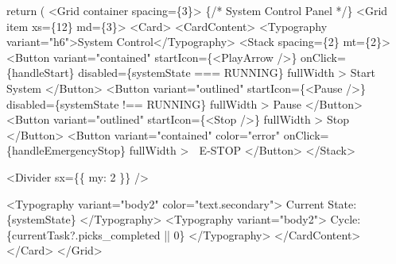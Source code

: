 \documentclass[
]{article}
\newenvironment{Shaded}{\begin{snugshade}}{\end{snugshade}}
\newcommand{\NormalTok}[1]{#1}
\begin{document}
\begin{Shaded}
\begin{Highlighting}[]
\NormalTok{  return (}
\NormalTok{    \textless{}Grid container spacing=\{3\}\textgreater{}}
\NormalTok{      \{/* System Control Panel */\}}
\NormalTok{      \textless{}Grid item xs=\{12\} md=\{3\}\textgreater{}}
\NormalTok{        \textless{}Card\textgreater{}}
\NormalTok{          \textless{}CardContent\textgreater{}}
\NormalTok{            \textless{}Typography variant="h6"\textgreater{}System Control\textless{}/Typography\textgreater{}}
\NormalTok{            \textless{}Stack spacing=\{2\} mt=\{2\}\textgreater{}}
\NormalTok{              \textless{}Button}
\NormalTok{                variant="contained"}
\NormalTok{                startIcon=\{\textless{}PlayArrow /\textgreater{}\}}
\NormalTok{                onClick=\{handleStart\}}
\NormalTok{                disabled=\{systemState === \textquotesingle{}RUNNING\textquotesingle{}\}}
\NormalTok{                fullWidth}
\NormalTok{              \textgreater{}}
\NormalTok{                Start System}
\NormalTok{              \textless{}/Button\textgreater{}}
\NormalTok{              \textless{}Button}
\NormalTok{                variant="outlined"}
\NormalTok{                startIcon=\{\textless{}Pause /\textgreater{}\}}
\NormalTok{                disabled=\{systemState !== \textquotesingle{}RUNNING\textquotesingle{}\}}
\NormalTok{                fullWidth}
\NormalTok{              \textgreater{}}
\NormalTok{                Pause}
\NormalTok{              \textless{}/Button\textgreater{}}
\NormalTok{              \textless{}Button}
\NormalTok{                variant="outlined"}
\NormalTok{                startIcon=\{\textless{}Stop /\textgreater{}\}}
\NormalTok{                fullWidth}
\NormalTok{              \textgreater{}}
\NormalTok{                Stop}
\NormalTok{              \textless{}/Button\textgreater{}}
\NormalTok{              \textless{}Button}
\NormalTok{                variant="contained"}
\NormalTok{                color="error"}
\NormalTok{                onClick=\{handleEmergencyStop\}}
\NormalTok{                fullWidth}
\NormalTok{              \textgreater{}}
\NormalTok{                🚨 E{-}STOP}
\NormalTok{              \textless{}/Button\textgreater{}}
\NormalTok{            \textless{}/Stack\textgreater{}}

\NormalTok{            \textless{}Divider sx=\{\{ my: 2 \}\} /\textgreater{}}

\NormalTok{            \textless{}Typography variant="body2" color="text.secondary"\textgreater{}}
\NormalTok{              Current State: \{systemState\}}
\NormalTok{            \textless{}/Typography\textgreater{}}
\NormalTok{            \textless{}Typography variant="body2"\textgreater{}}
\NormalTok{              Cycle: \{currentTask?.picks\_completed || 0\}}
\NormalTok{            \textless{}/Typography\textgreater{}}
\NormalTok{          \textless{}/CardContent\textgreater{}}
\NormalTok{        \textless{}/Card\textgreater{}}
\NormalTok{      \textless{}/Grid\textgreater{}}


\end{Highlighting}
\end{Shaded}
\end{document}
